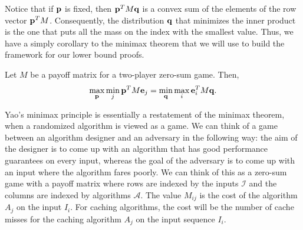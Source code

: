 Notice that if $\mathbf{p}$ is fixed, then $\mathbf{p}^TM \mathbf{q}$ is a convex sum of the elements of the row vector $\mathbf{p}^TM$. Consequently, the distribution $\mathbf{q}$ that minimizes the inner product is the one that puts all the mass on the index with the smallest value. Thus, we have a simply corollary to the minimax theorem that we will use to build the framework for our lower bound proofs.

\begin{corollary}
	Let $M$ be a payoff matrix for a two-player zero-sum game. Then,
	\begin{align*}
		\max_{\mathbf{p}}\min_j \mathbf{p}^TM\mathbf{e}_j = \min_{\mathbf{q}}\max_i \mathbf{e}_i^TM \mathbf{q}.
	\end{align*}
\end{corollary}

Yao's minimax principle is essentially a restatement of the minimax theorem, when a randomized algorithm is viewed as a game. We can think of a game between an algorithm designer and an adversary in the following way: the aim of the designer is to come up with an algorithm that has good performance guarantees on every input, whereas the goal of the adversary is to come up with an input where the algorithm fares poorly. We can think of this as a zero-sum game with a payoff matrix where rows are indexed by the inputs $\mathcal{I}$ and the columns are indexed by algorithms $\mathcal{A}$. The value $M_{ij}$ is the cost of the algorithm $A_j$ on the input $I_i$. For caching algorithms, the cost will be the number of cache misses for the caching algorithm $A_j$ on the input sequence $I_i$.

